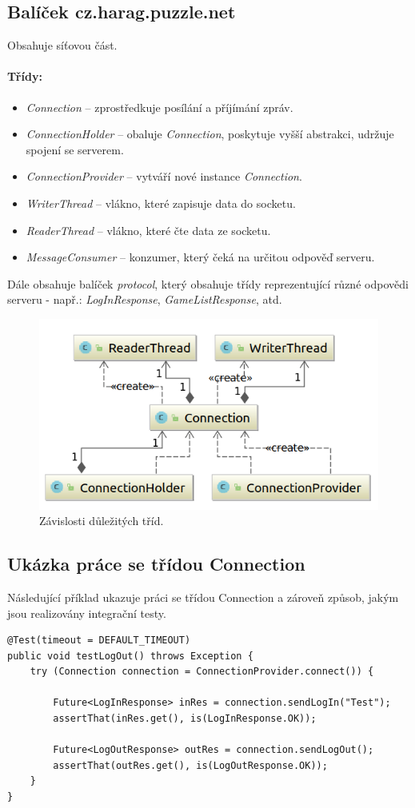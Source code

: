 \documentclass[12pt, a4paper]{report}
\begin{document}
\subsection{Balíček cz.harag.puzzle.net}
Obsahuje síťovou část.

\paragraph{Třídy:}
\begin{itemize}
	\item \emph{Connection} -- zprostředkuje posílání a příjímání zpráv.
	\item \emph{ConnectionHolder} -- obaluje \emph{Connection}, poskytuje vyšší abstrakci, udržuje spojení se serverem.
	\item \emph{ConnectionProvider} -- vytváří nové instance \emph{Connection}.
	\item \emph{WriterThread} -- vlákno, které zapisuje data do socketu.
	\item \emph{ReaderThread} -- vlákno, které čte data ze socketu. 
	\item \emph{MessageConsumer} -- konzumer, který čeká na určitou odpověď serveru.
\end{itemize}
Dále obsahuje balíček \emph{protocol}, který obsahuje třídy reprezentující různé odpovědi serveru - např.: \emph{LogInResponse}, \emph{GameListResponse}, atd.

\begin{figure}[H]
	\centering
	\includegraphics[width=0.6\linewidth]{img-net-d}
	\caption{Závislosti důležitých tříd.}
	\label{fig:img-net-d}
\end{figure}

\subsection{Ukázka práce se třídou Connection}
Následující příklad ukazuje práci se třídou Connection a zároveň způsob, jakým jsou realizovány integrační testy.
\begin{lstlisting}
@Test(timeout = DEFAULT_TIMEOUT)
public void testLogOut() throws Exception {
    try (Connection connection = ConnectionProvider.connect()) {

        Future<LogInResponse> inRes = connection.sendLogIn("Test");
        assertThat(inRes.get(), is(LogInResponse.OK));

        Future<LogOutResponse> outRes = connection.sendLogOut();
        assertThat(outRes.get(), is(LogOutResponse.OK));
    }
}
\end{lstlisting}
\end{document}
